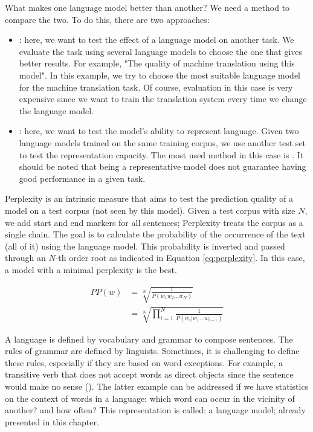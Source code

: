 \documentclass{KBook}
\begin{document}
What makes one language model better than another? 
We need a method to compare the two. 
To do this, there are two approaches: 
\begin{itemize}
	\item {}: here, we want to test the effect of a language model on another task. 
	We evaluate the task using several language models to choose the one that gives better results.
	For example, "The quality of machine translation using this model". 
	In this example, we try to choose the most suitable language model for the machine translation task.
	Of course, evaluation in this case is very expensive since we want to train the translation system every time we change the language model.
	
	\item {}: here, we want to test the model's ability to represent language. 
	Given two language models trained on the same training corpus, we use another test set to test the representation capacity.
	The most used method in this case is .
	It should be noted that being a representative model does not guarantee having good performance in a given task.
\end{itemize}

Perplexity is an intrinsic measure that aims to test the prediction quality of a model on a test corpus (not seen by this model). 
Given a test corpus with size $N$, we add start and end markers for all sentences; Perplexity treats the corpus as a single chain. 
The goal is to calculate the probability of the occurrence of the text (all of it) using the language model. 
This probability is inverted and passed through an $N$-th order root as indicated in Equation \ref{eq:perplexity}.
In this case, a model with a minimal perplexity is the best.

\begin{align}
	PP(w) & = \sqrt[N]{\frac{1}{P(w_1 w_2 \ldots w_N)}} \nonumber\\
	& = \sqrt[N]{\prod\limits_{i=1}^{N}\frac{1}{P(w_i | w_1 \ldots w_{i-1})}} \label{eq:perplexity}
\end{align}



A language is defined by vocabulary and grammar to compose sentences. The rules of grammar are defined by linguists. Sometimes, it is challenging to define these rules, especially if they are based on word exceptions. For example, a transitive verb that does not accept words as direct objects since the sentence would make no sense (). The latter example can be addressed if we have statistics on the context of words in a language: which word can occur in the vicinity of another? and how often?
This representation is called: a language model; already presented in this chapter.
\end{document}
